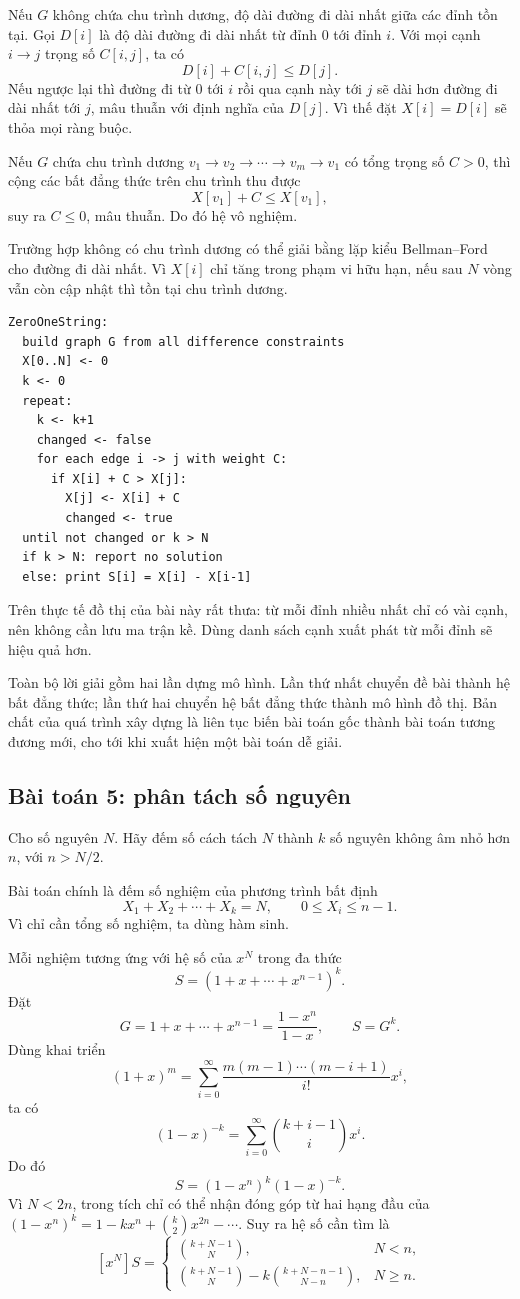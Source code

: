 \documentclass[11pt]{article}
\newcommand{\problem}[1]{\subsection*{#1}}
\begin{document}
Nếu $G$ không chứa chu trình dương, độ dài đường đi dài nhất giữa các đỉnh
tồn tại. Gọi $D[i]$ là độ dài đường đi dài nhất từ đỉnh $0$ tới đỉnh $i$.
Với mọi cạnh $i\to j$ trọng số $C[i,j]$, ta có
\[
D[i]+C[i,j]\le D[j].
\]
Nếu ngược lại thì đường đi từ $0$ tới $i$ rồi qua cạnh này tới $j$ sẽ dài hơn
đường đi dài nhất tới $j$, mâu thuẫn với định nghĩa của $D[j]$. Vì thế đặt
$X[i]=D[i]$ sẽ thỏa mọi ràng buộc.

Nếu $G$ chứa chu trình dương
$v_1\to v_2\to\cdots\to v_m\to v_1$ có tổng trọng số $C>0$, thì cộng các
bất đẳng thức trên chu trình thu được
\[
X[v_1]+C\le X[v_1],
\]
suy ra $C\le 0$, mâu thuẫn. Do đó hệ vô nghiệm.

Trường hợp không có chu trình dương có thể giải bằng lặp kiểu Bellman--Ford
cho đường đi dài nhất. Vì $X[i]$ chỉ tăng trong phạm vi hữu hạn, nếu sau $N$
vòng vẫn còn cập nhật thì tồn tại chu trình dương.

\begin{verbatim}
ZeroOneString:
  build graph G from all difference constraints
  X[0..N] <- 0
  k <- 0
  repeat:
    k <- k+1
    changed <- false
    for each edge i -> j with weight C:
      if X[i] + C > X[j]:
        X[j] <- X[i] + C
        changed <- true
  until not changed or k > N
  if k > N: report no solution
  else: print S[i] = X[i] - X[i-1]
\end{verbatim}

Trên thực tế đồ thị của bài này rất thưa: từ mỗi đỉnh nhiều nhất chỉ có vài
cạnh, nên không cần lưu ma trận kề. Dùng danh sách cạnh xuất phát từ mỗi đỉnh
sẽ hiệu quả hơn.

Toàn bộ lời giải gồm hai lần dựng mô hình. Lần thứ nhất chuyển đề bài thành
hệ bất đẳng thức; lần thứ hai chuyển hệ bất đẳng thức thành mô hình đồ thị.
Bản chất của quá trình xây dựng là liên tục biến bài toán gốc thành bài toán
tương đương mới, cho tới khi xuất hiện một bài toán dễ giải.

\problem{Bài toán 5: phân tách số nguyên}

Cho số nguyên $N$. Hãy đếm số cách tách $N$ thành $k$ số nguyên không âm nhỏ
hơn $n$, với $n>N/2$.

Bài toán chính là đếm số nghiệm của phương trình bất định
\[
X_1+X_2+\cdots+X_k=N,\qquad 0\le X_i\le n-1.
\]
Vì chỉ cần tổng số nghiệm, ta dùng hàm sinh.

Mỗi nghiệm tương ứng với hệ số của $x^N$ trong đa thức
\[
S=(1+x+\cdots+x^{n-1})^k.
\]
Đặt
\[
G=1+x+\cdots+x^{n-1}=\frac{1-x^n}{1-x},
\qquad S=G^k.
\]
Dùng khai triển
\[
(1+x)^m=\sum_{i=0}^{\infty}
\frac{m(m-1)\cdots(m-i+1)}{i!}x^i,
\]
ta có
\[
(1-x)^{-k}
=\sum_{i=0}^{\infty}\binom{k+i-1}{i}x^i.
\]
Do đó
\[
S=(1-x^n)^k(1-x)^{-k}.
\]
Vì $N<2n$, trong tích chỉ có thể nhận đóng góp từ hai hạng đầu của
$(1-x^n)^k=1-kx^n+\binom{k}{2}x^{2n}-\cdots$. Suy ra hệ số cần tìm là
\[
[x^N]S=
\begin{cases}
\binom{k+N-1}{N}, & N<n,\\[0.6em]
\binom{k+N-1}{N}-k\binom{k+N-n-1}{N-n}, & N\ge n.
\end{cases}
\]
\end{document}
